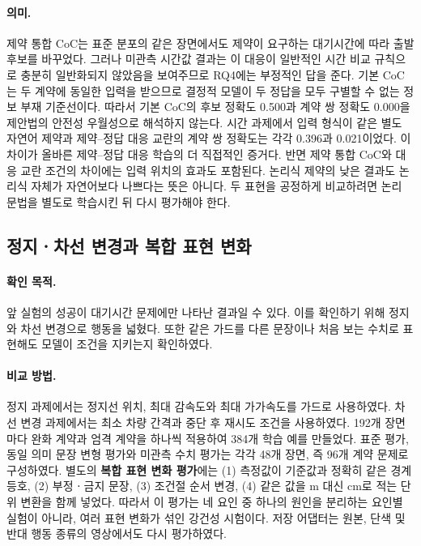 \paragraph{의미.}
제약 통합 CoC는 표준 분포의 같은 장면에서도 제약이 요구하는 대기시간에 따라 출발 후보를 바꾸었다. 그러나 미관측 시간값 결과는 이 대응이 일반적인 시간 비교 규칙으로 충분히 일반화되지 않았음을 보여주므로 RQ4에는 부정적인 답을 준다. 기본 CoC는 두 계약에 동일한 입력을 받으므로 결정적 모델이 두 정답을 모두 구별할 수 없는 정보 부재 기준선이다. 따라서 기본 CoC의 후보 정확도 0.500과 계약 쌍 정확도 0.000을 제안법의 안전성 우월성으로 해석하지 않는다. 시간 과제에서 입력 형식이 같은 별도 자연어 제약과 제약--정답 대응 교란의 계약 쌍 정확도는 각각 0.396과 0.021이었다. 이 차이가 올바른 제약--정답 대응 학습의 더 직접적인 증거다. 반면 제약 통합 CoC와 대응 교란 조건의 차이에는 입력 위치의 효과도 포함된다. 논리식 제약의 낮은 결과도 논리식 자체가 자연어보다 나쁘다는 뜻은 아니다. 두 표현을 공정하게 비교하려면 논리 문법을 별도로 학습시킨 뒤 다시 평가해야 한다.

\subsection{정지ㆍ차선 변경과 복합 표현 변화}

\paragraph{확인 목적.}
앞 실험의 성공이 대기시간 문제에만 나타난 결과일 수 있다. 이를 확인하기 위해 정지와 차선 변경으로 행동을 넓혔다. 또한 같은 가드를 다른 문장이나 처음 보는 수치로 표현해도 모델이 조건을 지키는지 확인하였다.

\paragraph{비교 방법.}
정지 과제에서는 정지선 위치, 최대 감속도와 최대 가가속도를 가드로 사용하였다. 차선 변경 과제에서는 최소 차량 간격과 중단 후 재시도 조건을 사용하였다. 192개 장면마다 완화 계약과 엄격 계약을 하나씩 적용하여 384개 학습 예를 만들었다. 표준 평가, 동일 의미 문장 변형 평가와 미관측 수치 평가는 각각 48개 장면, 즉 96개 계약 문제로 구성하였다. 별도의 \textbf{복합 표현 변화 평가}에는 (1) 측정값이 기준값과 정확히 같은 경계 등호, (2) 부정ㆍ금지 문장, (3) 조건절 순서 변경, (4) 같은 값을 m 대신 cm로 적는 단위 변환을 함께 넣었다. 따라서 이 평가는 네 요인 중 하나의 원인을 분리하는 요인별 실험이 아니라, 여러 표현 변화가 섞인 강건성 시험이다. 저장 어댑터는 원본, 단색 및 반대 행동 종류의 영상에서도 다시 평가하였다.


